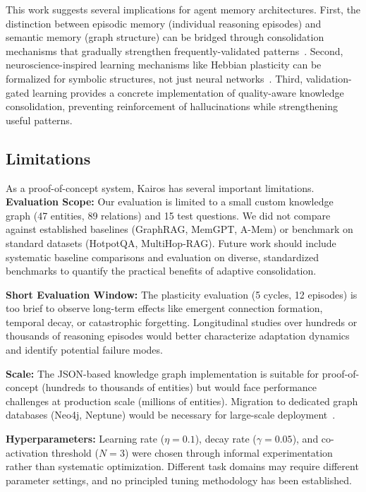 \documentclass{article}
\begin{document}
This work suggests several implications for agent memory architectures. First, the distinction between episodic memory (individual reasoning episodes) and semantic memory (graph structure) can be bridged through consolidation mechanisms that gradually strengthen frequently-validated patterns~\citep{squire2015memory}. Second, neuroscience-inspired learning mechanisms like Hebbian plasticity can be formalized for symbolic structures, not just neural networks~\citep{mvil2024hebbian}. Third, validation-gated learning provides a concrete implementation of quality-aware knowledge consolidation, preventing reinforcement of hallucinations while strengthening useful patterns.

\subsection{Limitations}

As a proof-of-concept system, Kairos has several important limitations. \textbf{Evaluation Scope:} Our evaluation is limited to a small custom knowledge graph (47 entities, 89 relations) and 15 test questions. We did not compare against established baselines (GraphRAG, MemGPT, A-Mem) or benchmark on standard datasets (HotpotQA, MultiHop-RAG). Future work should include systematic baseline comparisons and evaluation on diverse, standardized benchmarks to quantify the practical benefits of adaptive consolidation.

\textbf{Short Evaluation Window:} The plasticity evaluation (5 cycles, 12 episodes) is too brief to observe long-term effects like emergent connection formation, temporal decay, or catastrophic forgetting. Longitudinal studies over hundreds or thousands of reasoning episodes would better characterize adaptation dynamics and identify potential failure modes.

\textbf{Scale:} The JSON-based knowledge graph implementation is suitable for proof-of-concept (hundreds to thousands of entities) but would face performance challenges at production scale (millions of entities). Migration to dedicated graph databases (Neo4j, Neptune) would be necessary for large-scale deployment~\citep{edge2024graphrag}.

\textbf{Hyperparameters:} Learning rate ($\eta = 0.1$), decay rate ($\gamma = 0.05$), and co-activation threshold ($N = 3$) were chosen through informal experimentation rather than systematic optimization. Different task domains may require different parameter settings, and no principled tuning methodology has been established.
\end{document}
